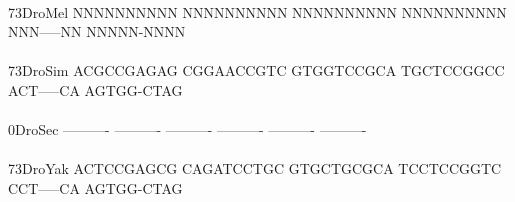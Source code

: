\documentclass[11pt,twoside,reqno,a4paper]{article}
\begin{document}
{\\
73\hspace*{2\charwidth}DroMel	NNNNNNNNNN	NNNNNNNNNN	NNNNNNNNNN	NNNNNNNNNN	NNN-----NN	NNNNN-NNNN	\\
\hspace*{4\charwidth}\hspace*{7\charwidth}\hspace*{1\charwidth}\hspace*{1\charwidth}\hspace*{1\charwidth}\hspace*{1\charwidth}\hspace*{1\charwidth}\hspace*{1\charwidth}\\
73\hspace*{2\charwidth}DroSim	ACGCCGAGAG	CGGAACCGTC	GTGGTCCGCA	TGCTCCGGCC	ACT-----CA	AGTGG-CTAG	\\
\hspace*{4\charwidth}\hspace*{7\charwidth}\hspace*{1\charwidth}\hspace*{1\charwidth}\hspace*{1\charwidth}\hspace*{1\charwidth}\hspace*{1\charwidth}\hspace*{1\charwidth}\\
0\hspace*{3\charwidth}DroSec	----------	----------	----------	----------	----------	----------	\\
\hspace*{4\charwidth}\hspace*{7\charwidth}\hspace*{1\charwidth}\hspace*{1\charwidth}\hspace*{1\charwidth}\hspace*{1\charwidth}\hspace*{1\charwidth}\hspace*{1\charwidth}\\
73\hspace*{2\charwidth}DroYak	ACTCCGAGCG	CAGATCCTGC	GTGCTGCGCA	TCCTCCGGTC	CCT-----CA	AGTGG-CTAG	\\
\hspace*{4\charwidth}\hspace*{7\charwidth}\hspace*{1\charwidth}\hspace*{1\charwidth}\hspace*{1\charwidth}\hspace*{1\charwidth}\hspace*{1\charwidth}\hspace*{1\charwidth}\\
}
\end{document}
